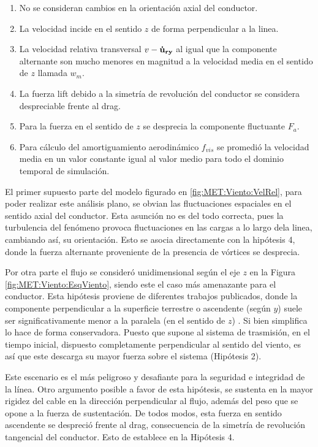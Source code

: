 \begin{enumerate}
	\item No se consideran cambios en la orientación axial del conductor.
	\item La velocidad incide en el sentido $z$ de forma perpendicular a la linea. 
	\item La velocidad relativa transversal $v-\bf{\dot{u}}_{ry}$ al igual que la componente alternante son mucho menores en magnitud a la velocidad media en el sentido de $z$ llamada $w_m$.
	\item La fuerza lift debido a la simetría de revolución del conductor se considera despreciable frente al drag.
	\item Para la fuerza en el sentido de $z$ se desprecia la componente fluctuante $F_a$.
	\item Para cálculo del amortiguamiento aerodinámico $f_{vis}$ se promedió la velocidad media en un valor constante igual al valor medio para todo el dominio temporal de simulación.
\end{enumerate}

El primer supuesto parte del modelo figurado en \ref{fig:MET:Viento:VelRel}, para poder realizar este análisis plano, se obvian las fluctuaciones espaciales en el sentido axial del conductor. Esta asunción no es del todo correcta, pues la turbulencia del fenómeno provoca fluctuaciones en las cargas a lo largo dela linea, cambiando así, su orientación.  Esto se asocia directamente con la hipótesis 4, donde la fuerza alternante proveniente de la presencia de vórtices se desprecia. 


Por otra parte el flujo se consideró unidimensional según el eje $z$ en la Figura \ref{fig:MET:Viento:EsqViento}, siendo este el caso más amenazante para el conductor. Esta hipótesis proviene de diferentes trabajos publicados, donde la componente perpendicular a la superficie terrestre o ascendente (según $y$) suele ser significativamente menor a la paralela (en el sentido de $z$) \citep{duranona2009analysis} \citep{stengel2017measurements} \cite{yang2016nonlinear}. Si bien simplifica lo hace de forma conservadora.  Puesto que supone al sistema de trasmisión, en el tiempo inicial, dispuesto completamente perpendicular al sentido del viento, es así que este descarga su mayor fuerza sobre el sistema (Hipótesis 2). 

Este escenario es el más peligroso y desafiante para la seguridad e integridad de la línea. Otro argumento posible a favor de esta hipótesis, se sustenta en la mayor rigidez del cable en la dirección perpendicular al flujo, además del peso que se opone a la fuerza de sustentación. De todos modos, esta fuerza en sentido ascendente se despreció frente al drag, consecuencia de la simetría de revolución tangencial del conductor. Esto de establece en la Hipótesis 4. 

